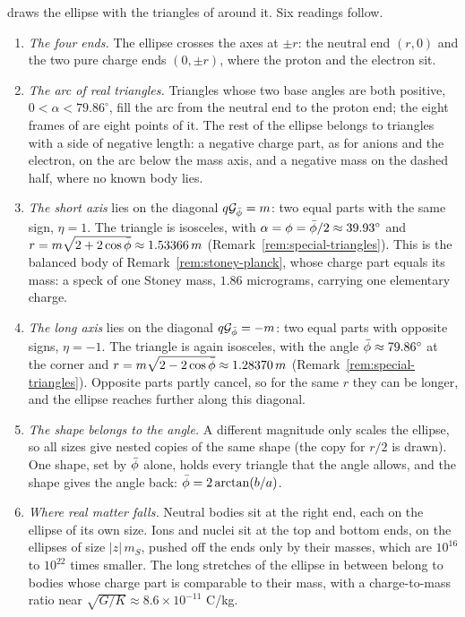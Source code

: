  draws the ellipse with the triangles of  around it. Six readings follow.
\begin{enumerate}
  \item \emph{The four ends.} The ellipse crosses the axes at $\pm r$: the neutral end $(r, 0)$ and the two pure charge ends $(0, \pm r)$, where the proton and the electron sit.
  \item \emph{The arc of real triangles.} Triangles whose two base angles are both positive, $0 < \alpha < 79.86^\circ$, fill the arc from the neutral end to the proton end; the eight frames of  are eight points of it. The rest of the ellipse belongs to triangles with a side of negative length: a negative charge part, as for anions and the electron, on the arc below the mass axis, and a negative mass on the dashed half, where no known body lies.
  \item \emph{The short axis} lies on the diagonal $q\mathcal{G}_{\bar{\phi}} = m$: two equal parts with the same sign, $\eta = 1$. The triangle is isosceles, with $\alpha = \phi = \bar{\phi}/2 \approx 39.93^\circ$ and $r = m\sqrt{2 + 2\cos\bar{\phi}} \approx 1.53366\,m$ (Remark~\ref{rem:special-triangles}). This is the balanced body of Remark~\ref{rem:stoney-planck}, whose charge part equals its mass: a speck of one Stoney mass, $1.86$ micrograms, carrying one elementary charge.
  \item \emph{The long axis} lies on the diagonal $q\mathcal{G}_{\bar{\phi}} = -m$: two equal parts with opposite signs, $\eta = -1$. The triangle is again isosceles, with the angle $\bar{\phi} \approx 79.86^\circ$ at the corner and $r = m\sqrt{2 - 2\cos\bar{\phi}} \approx 1.28370\,m$ (Remark~\ref{rem:special-triangles}). Opposite parts partly cancel, so for the same $r$ they can be longer, and the ellipse reaches further along this diagonal.
  \item \emph{The shape belongs to the angle.} A different magnitude only scales the ellipse, so all sizes give nested copies of the same shape (the copy for $r/2$ is drawn). One shape, set by $\bar{\phi}$ alone, holds every triangle that the angle allows, and the shape gives the angle back: $\bar{\phi} = 2\arctan(b/a)$.
  \item \emph{Where real matter falls.} Neutral bodies sit at the right end, each on the ellipse of its own size. Ions and nuclei sit at the top and bottom ends, on the ellipses of size $|z|\,m_S$, pushed off the ends only by their masses, which are $10^{16}$ to $10^{22}$ times smaller. The long stretches of the ellipse in between belong to bodies whose charge part is comparable to their mass, with a charge-to-mass ratio near $\sqrt{G/K} \approx 8.6 \times 10^{-11}$ C/kg.
\end{enumerate}

